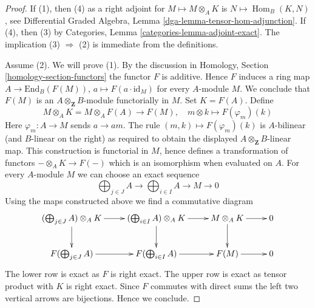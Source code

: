 \documentclass[10pt,a4paper]{amsart}
\theoremstyle{plain}
\theoremstyle{definition}
\theoremstyle{remark}
\numberwithin{equation}{subsection}
\def\Hom{\mathop{\mathrm{Hom}}\nolimits}
\begin{document}
\begin{proof}
If (1), then (4) as a right adjoint for $M \mapsto M \otimes_A K$
is $N \mapsto \Hom_B(K, N)$, see
Differential Graded Algebra, Lemma \ref{dga-lemma-tensor-hom-adjunction}.
If (4), then (3) by Categories, Lemma \ref{categories-lemma-adjoint-exact}.
The implication (3) $\Rightarrow$ (2) is immediate from the definitions.

\medskip\noindent
Assume (2). We will prove (1). By the discussion in
Homology, Section \ref{homology-section-functors}
the functor $F$ is additive. Hence $F$ induces
a ring map $A \to \text{End}_B(F(M))$, $a \mapsto F(a \cdot \text{id}_M)$
for every $A$-module $M$. We conclude that $F(M)$ is an
$A \otimes_\mathbf{Z} B$-module functorially in $M$.
Set $K = F(A)$. Define
$$
M \otimes_A K = M \otimes_A F(A) \longrightarrow F(M),
\quad m \otimes k \longmapsto F(\varphi_m)(k)
$$
Here $\varphi_m : A \to M$ sends $a \to am$. The rule
$(m, k) \mapsto F(\varphi_m)(k)$ is $A$-bilinear (and $B$-linear
on the right) as required to obtain the displayed
$A \otimes_\mathbf{Z} B$-linear map.
This construction is functorial in $M$, hence defines a transformation
of functors $- \otimes_A K \to F(-)$ which is an isomorphism when
evaluated on $A$. For every $A$-module $M$ we can choose an exact sequence
$$
\bigoplus\nolimits_{j \in J} A \to
\bigoplus\nolimits_{i \in I} A \to
M \to 0
$$
Using the maps constructed above we find a commutative diagram
$$
\xymatrix{
(\bigoplus\nolimits_{j \in J} A) \otimes_A K \ar[r] \ar[d] &
(\bigoplus\nolimits_{i \in I} A) \otimes_A K \ar[r] \ar[d] &
M \otimes_A K \ar[r] \ar[d] &
0 \\
F(\bigoplus\nolimits_{j \in J} A) \ar[r] &
F(\bigoplus\nolimits_{i \in I} A) \ar[r] &
F(M) \ar[r] &  0
}
$$
The lower row is exact as $F$ is right exact.
The upper row is exact as tensor product with $K$ is right exact.
Since $F$ commutes with direct sums the left two vertical arrows
are bijections. Hence we conclude.
\end{proof}
\end{document}
